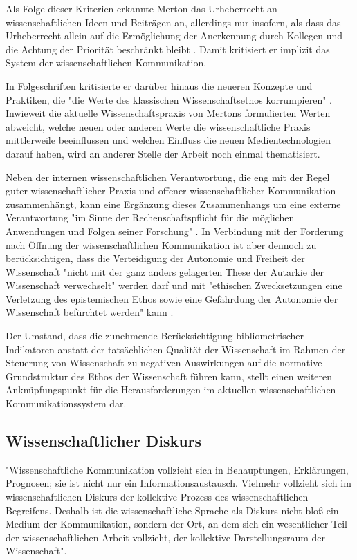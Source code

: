 Als Folge dieser Kriterien erkannte Merton das Urheberrecht an wissenschaftlichen Ideen und Beiträgen an, allerdings nur insofern, als dass das Urheberrecht allein auf die Ermöglichung der Anerkennung durch Kollegen und die Achtung der Priorität beschränkt bleibt \cite{Fangerau_2014}. Damit kritisiert er implizit das System der wissenschaftlichen Kommunikation.

In Folgeschriften kritisierte er darüber hinaus die neueren Konzepte und Praktiken, die "die Werte des klassischen Wissenschaftsethos korrumpieren" \cite{Fröhlich_oa_2009}. Inwieweit die aktuelle Wissenschaftspraxis von Mertons formulierten Werten abweicht, welche neuen oder anderen Werte die wissenschaftliche Praxis mittlerweile beeinflussen und welchen Einfluss die neuen Medientechnologien darauf haben, wird an anderer Stelle der Arbeit noch einmal thematisiert.

Neben der internen wissenschaftlichen Verantwortung, die eng mit der Regel guter wissenschaftlicher Praxis und offener wissenschaftlicher Kommunikation zusammenhängt, kann eine Ergänzung dieses Zusammenhangs um eine externe Verantwortung "im Sinne der Rechenschaftspflicht für die möglichen Anwendungen und Folgen seiner Forschung" \cite{Oezmen_2015}. In Verbindung mit der Forderung nach Öffnung der wissenschaftlichen Kommunikation ist aber dennoch zu berücksichtigen, dass die Verteidigung der Autonomie und Freiheit der Wissenschaft "nicht mit der ganz anders gelagerten These der Autarkie der Wissenschaft verwechselt" werden darf und mit "ethischen Zwecksetzungen eine Verletzung des epistemischen Ethos sowie eine Gefährdung der Autonomie der Wissenschaft befürchtet werden" kann \cite{Oezmen_2015}.

Der Umstand, dass die zunehmende Berücksichtigung bibliometrischer Indikatoren anstatt der tatsächlichen Qualität der Wissenschaft im Rahmen der Steuerung von Wissenschaft zu negativen Auswirkungen auf die normative Grundstruktur des Ethos der Wissenschaft führen kann, stellt einen weiteren Anknüpfungspunkt für die Herausforderungen im aktuellen wissenschaftlichen Kommunikationssystem dar.

\subsection{Wissenschaftlicher Diskurs}

"Wissenschaftliche Kommunikation vollzieht sich in Behauptungen, Erklärungen, Prognosen; sie ist nicht nur ein Informationsaustausch. Vielmehr vollzieht sich im wissenschaftlichen Diskurs der kollektive Prozess des wissenschaftlichen Begreifens. Deshalb ist die wissenschaftliche Sprache als Diskurs nicht bloß ein Medium der Kommunikation, sondern der Ort, an dem sich ein wesentlicher Teil der wissenschaftlichen Arbeit vollzieht, der kollektive Darstellungsraum der Wissenschaft". \cite{bohme_1978_wissenschaftssprachen}

